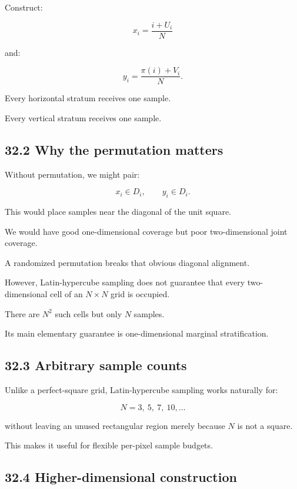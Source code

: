 Construct:

\[ \boxed{ x_i=\frac{i+U_i}{N} } \]

and:

\[ \boxed{ y_i=\frac{\pi(i)+V_i}{N} }. \]

Every horizontal stratum receives one sample.

Every vertical stratum receives one sample.

\subsection{32.2 Why the permutation matters}\label{02-foundations-ii-ch031-why-the-permutation-matters}

\hypertarget{02-foundations-ii-ch031-why-the-permutation-matters}{}

Without permutation, we might pair:

\[ x_i\in D_i,\qquad y_i\in D_i. \]

This would place samples near the diagonal of the unit square.

We would have good one-dimensional coverage but poor two-dimensional joint coverage.

A randomized permutation breaks that obvious diagonal alignment.

However, Latin-hypercube sampling does not guarantee that every two-dimensional cell of an \(N\times N\) grid is occupied.

There are \(N^2\) such cells but only \(N\) samples.

Its main elementary guarantee is one-dimensional marginal stratification.

\subsection{32.3 Arbitrary sample counts}\label{02-foundations-ii-ch031-arbitrary-sample-counts}

\hypertarget{02-foundations-ii-ch031-arbitrary-sample-counts}{}

Unlike a perfect-square grid, Latin-hypercube sampling works naturally for:

\[ N=3,\ 5,\ 7,\ 10,\ldots \]

without leaving an unused rectangular region merely because \(N\) is not a square.

This makes it useful for flexible per-pixel sample budgets.

\subsection{32.4 Higher-dimensional construction}\label{02-foundations-ii-ch031-higher-dimensional-construction}

